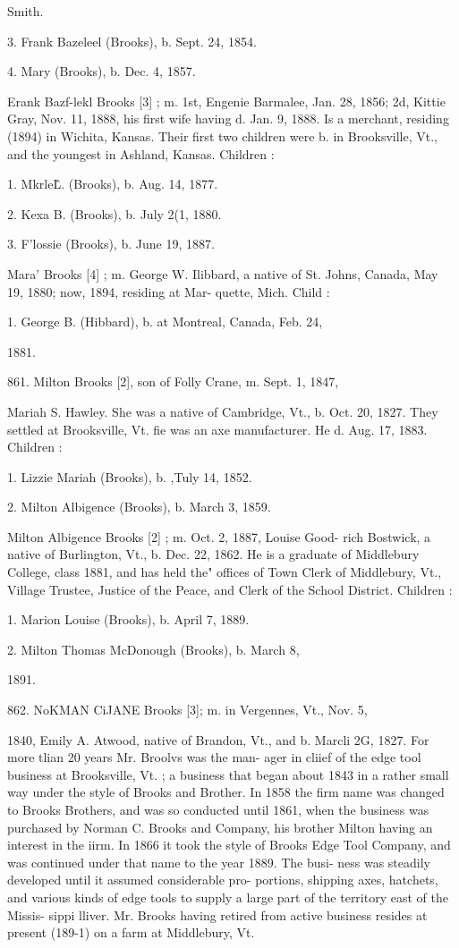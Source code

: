 \documentclass{book}
\begin{document}
Smith. 

3. Frank Bazeleel (Brooks), b. Sept. 24, 1854. 

4. Mary (Brooks), b. Dec. 4, 1857. 

Erank Bazf-lekl Brooks [3] ; m. 1st, Engenie Barmalee, Jan. 
28, 1856; 2d, Kittie Gray, Nov. 11, 1888, his first wife having 
d. Jan. 9, 1888. Is a merchant, residing (1894) in Wichita, 
Kansas. Their first two children were b. in Brooksville, Vt., 
and the youngest in Ashland, Kansas. Children : 

1. Mkrle\^L. (Brooks), b. Aug. 14, 1877. 

2. Kexa B. (Brooks), b. July 2(1, 1880. 

3. F'lossie (Brooks), b. June 19, 1887. 

Mara' Brooks [4] ; m. George W. Ilibbard, a native of St. 
Johns, Canada, May 19, 1880; now, 1894, residing at Mar- 
quette, Mich. Child : 

1. George B. (Hibbard), b. at Montreal, Canada, Feb. 24, 

1881. 

861. Milton Brooks [2], son of Folly Crane, m. Sept. 1, 1847, 

Mariah S. Hawley. She was a native of Cambridge, Vt., b. 
Oct. 20, 1827. They settled at Brooksville, Vt. fie was an 
axe manufacturer. He d. Aug. 17, 1883. Children : 

1. Lizzie Mariah (Brooks), b. ,Tuly 14, 1852. 

2. Milton Albigence (Brooks), b. March 3, 1859. 

Milton Albigence Brooks [2] ; m. Oct. 2, 1887, Louise Good- 
rich Bostwick, a native of Burlington, Vt., b. Dec. 22, 1862. 
He is a graduate of Middlebury College, class 1881, and has 
held the" offices of Town Clerk of Middlebury, Vt., Village 
Trustee, Justice of the Peace, and Clerk of the School District. 
Children : 

1. Marion Louise (Brooks), b. April 7, 1889. 

2. Milton Thomas McDonough (Brooks), b. March 8, 

1891. 




862. NoKMAN CiJANE Brooks [3]; m. in Vergennes, Vt., Nov. 5, 

1840, Emily A. Atwood, native of Brandon, Vt., and b. Marcli 
2G, 1827. For more tlian 20 years Mr. Broolvs was the man- 
ager in cliief of the edge tool business at Brooksville, Vt. ; a 
business that began about 1843 in a rather small way under 
the style of Brooks and Brother. In 1858 the firm name was 
changed to Brooks Brothers, and was so conducted until 1861, 
when the business was purchased by Norman C. Brooks and 
Company, his brother Milton having an interest in the iirm. 
In 1866 it took the style of Brooks Edge Tool Company, and 
was continued under that name to the year 1889. The busi- 
ness was steadily developed until it assumed considerable pro- 
portions, shipping axes, hatchets, and various kinds of edge 
tools to supply a large part of the territory east of the Missis- 
sippi lliver. Mr. Brooks having retired from active business 
resides at present (189-1) on a farm at Middlebury, Vt. 
\end{document}
